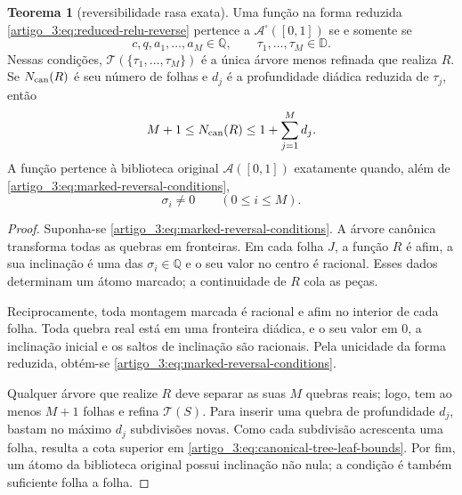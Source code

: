 \documentclass[12pt,a4paper]{article}
\theoremstyle{preciso}
\theoremstyle{definition}
\newcommand{\Aclass}{\mathcal{A}}
\theoremstyle{preciso}
\newtheorem{theorem}[teorema]{Teorema}
\theoremstyle{preciso}
\theoremstyle{preciso}
\theoremstyle{preciso}
\theoremstyle{definition}
\theoremstyle{preciso}
\theoremstyle{definition}
\theoremstyle{preciso}
\theoremstyle{preciso}
\theoremstyle{definition}
\begin{document}
\begin{theorem}[reversibilidade rasa exata]\label{map:artigo_3:5.2}
\label{artigo_3:thm:exact-marked-reversal}
Uma função na forma reduzida \eqref{artigo_3:eq:reduced-relu-reverse} pertence a
$\Aclass^\square([0,1])$ se e somente se
\begin{equation}
 c,q,a_1,\ldots,a_M\in\mathbb Q,
 \qquad
 \tau_1,\ldots,\tau_M\in\mathbb D.
 \label{artigo_3:eq:marked-reversal-conditions}
\end{equation}
Nessas condições, $\mathcal T(\{\tau_1,\ldots,\tau_M\})$ é a única árvore
menos refinada que realiza $R$. Se $N_{\rm can}(R)$ é seu número de folhas e
$d_j$ é a profundidade diádica reduzida de $\tau_j$, então
\begin{equation}
 M+1\le N_{\rm can}(R)
 \le 1+\sum_{j=1}^{M}d_j.
 \label{artigo_3:eq:canonical-tree-leaf-bounds}
\end{equation}
A função pertence à biblioteca original $\Aclass([0,1])$ exatamente quando,
além de \eqref{artigo_3:eq:marked-reversal-conditions},
\begin{equation}
 \sigma_i\ne0\qquad(0\le i\le M).
 \label{artigo_3:eq:original-nonflat-condition}
\end{equation}
\end{theorem}

\begin{proof}
Suponha-se \eqref{artigo_3:eq:marked-reversal-conditions}. A árvore canônica transforma
todas as quebras em fronteiras. Em cada folha $J$, a função $R$ é afim, a sua
inclinação é uma das $\sigma_i\in\mathbb Q$ e o seu valor no centro é racional.
Esses dados determinam um átomo marcado; a continuidade de $R$ cola as peças.

Reciprocamente, toda montagem marcada é racional e afim no interior de cada
folha. Toda quebra real está em uma fronteira diádica, e o seu valor em $0$, a
inclinação inicial e os saltos de inclinação são racionais. Pela unicidade da
forma reduzida, obtém-se \eqref{artigo_3:eq:marked-reversal-conditions}.

Qualquer árvore que realize $R$ deve separar as suas $M$ quebras reais; logo, tem
ao menos $M+1$ folhas e refina $\mathcal T(S)$. Para inserir uma quebra de
profundidade $d_j$, bastam no máximo $d_j$ subdivisões novas. Como cada
subdivisão acrescenta uma folha, resulta a cota superior em
\eqref{artigo_3:eq:canonical-tree-leaf-bounds}. Por fim, um átomo da biblioteca
original possui inclinação não nula; a condição é também suficiente folha a
folha.
\end{proof}
\end{document}
